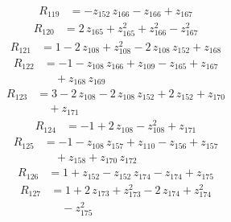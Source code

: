 \begin{equation*}\begin{aligned}
R_{119}&=-z_{152}\,z_{166} -z_{166} +z_{167}
\end{aligned}\end{equation*}
\begin{equation*}\begin{aligned}
R_{120}&=2\,z_{165} +z_{165}^{2} +z_{166}^{2} -z_{167}^{2}
\end{aligned}\end{equation*}
\begin{equation*}\begin{aligned}
R_{121}&=1 -2\,z_{108} +z_{108}^{2} -2\,z_{108}\,z_{152} +z_{168}
\end{aligned}\end{equation*}
\begin{equation*}\begin{aligned}
R_{122}&=-1 -z_{108}\,z_{166} +z_{109} -z_{165} +z_{167} \\
&\quad +z_{168}\,z_{169}
\end{aligned}\end{equation*}
\begin{equation*}\begin{aligned}
R_{123}&=3 -2\,z_{108} -2\,z_{108}\,z_{152} +2\,z_{152} +z_{170} \\
&\quad +z_{171}
\end{aligned}\end{equation*}
\begin{equation*}\begin{aligned}
R_{124}&=-1 +2\,z_{108} -z_{108}^{2} +z_{171}
\end{aligned}\end{equation*}
\begin{equation*}\begin{aligned}
R_{125}&=-1 -z_{108}\,z_{157} +z_{110} -z_{156} +z_{157} \\
&\quad +z_{158} +z_{170}\,z_{172}
\end{aligned}\end{equation*}
\begin{equation*}\begin{aligned}
R_{126}&=1 +z_{152} -z_{152}\,z_{174} -z_{174} +z_{175}
\end{aligned}\end{equation*}
\begin{equation*}\begin{aligned}
R_{127}&=1 +2\,z_{173} +z_{173}^{2} -2\,z_{174} +z_{174}^{2} \\
&\quad -z_{175}^{2}
\end{aligned}\end{equation*}

